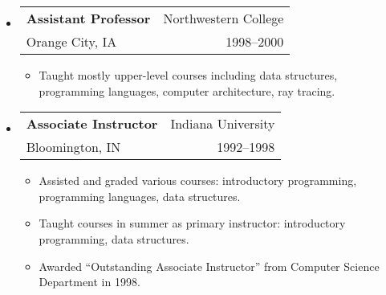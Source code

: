 \documentclass[letterpaper,10pt]{article}
\makeatletter
\newcommand{\resitem}[1]{\vspace{-2pt} \item #1}
\newcommand{\ressubheading}[4]{ 
\begin{tabular*}{7in}{l@{\extracolsep{\fill}}r}
	\textbf{#1} & #2 \\
	{#3} & {#4} \\
\end{tabular*}
\vspace{-6pt}}
\makeatother
\begin{document}
\begin{itemize}
	\item \ressubheading{Assistant Professor}{Northwestern College}{Orange City, IA}{1998--2000} 
  \vspace{-1mm}
	\begin{itemize}
		\resitem{Taught mostly upper-level courses including data structures, programming languages, computer architecture, ray tracing.}
	\end{itemize}
	
	\item \ressubheading{Associate Instructor}{Indiana University}{Bloomington, IN}{1992--1998} 
  \vspace{-1mm}
	\begin{itemize}
		\resitem{Assisted and graded various courses: introductory programming, programming languages, data structures.}
		\resitem{Taught courses in summer as primary instructor: introductory programming, data structures.}
		\resitem{Awarded ``Outstanding Associate Instructor'' from Computer Science Department in 1998.}
	\end{itemize}
\end{itemize}
\end{document}
